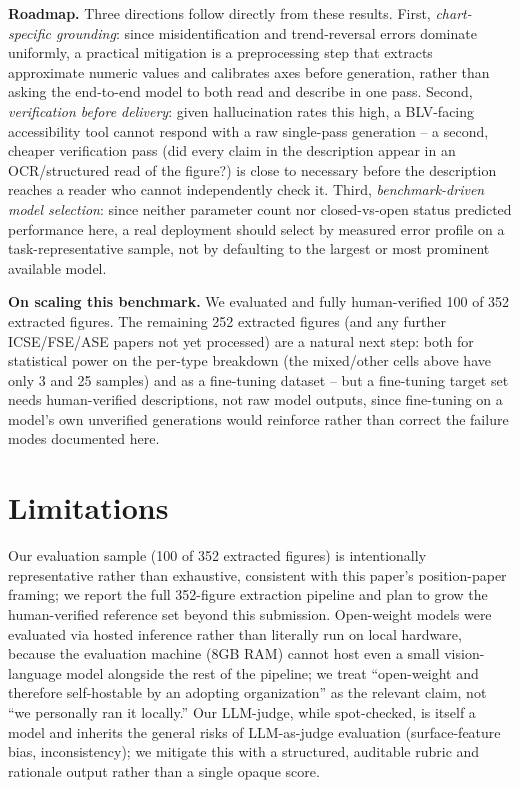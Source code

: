 \documentclass[10pt,conference]{IEEEtran}
\begin{document}
\textbf{Roadmap.} Three directions follow directly from these results. First, \emph{chart-specific grounding}: since misidentification and trend-reversal errors dominate uniformly, a practical mitigation is a preprocessing step that extracts approximate numeric values and calibrates axes before generation, rather than asking the end-to-end model to both read and describe in one pass. Second, \emph{verification before delivery}: given hallucination rates this high, a BLV-facing accessibility tool cannot respond with a raw single-pass generation -- a second, cheaper verification pass (did every claim in the description appear in an OCR/structured read of the figure?) is close to necessary before the description reaches a reader who cannot independently check it. Third, \emph{benchmark-driven model selection}: since neither parameter count nor closed-vs-open status predicted performance here, a real deployment should select by measured error profile on a task-representative sample, not by defaulting to the largest or most prominent available model.

\textbf{On scaling this benchmark.} We evaluated and fully human-verified 100 of 352 extracted figures. The remaining 252 extracted figures (and any further ICSE/FSE/ASE papers not yet processed) are a natural next step: both for statistical power on the per-type breakdown (the mixed/other cells above have only 3 and 25 samples) and as a fine-tuning dataset -- but a fine-tuning target set needs human-verified descriptions, not raw model outputs, since fine-tuning on a model's own unverified generations would reinforce rather than correct the failure modes documented here.

\section{Limitations}

Our evaluation sample (100 of 352 extracted figures) is intentionally representative rather than exhaustive, consistent with this paper's position-paper framing; we report the full 352-figure extraction pipeline and plan to grow the human-verified reference set beyond this submission. Open-weight models were evaluated via hosted inference rather than literally run on local hardware, because the evaluation machine (8GB RAM) cannot host even a small vision-language model alongside the rest of the pipeline; we treat ``open-weight and therefore self-hostable by an adopting organization'' as the relevant claim, not ``we personally ran it locally.'' Our LLM-judge, while spot-checked, is itself a model and inherits the general risks of LLM-as-judge evaluation (surface-feature bias, inconsistency); we mitigate this with a structured, auditable rubric and rationale output rather than a single opaque score.
\end{document}
